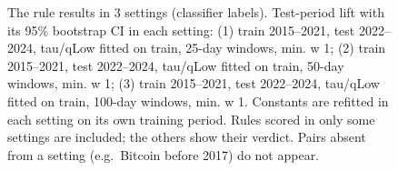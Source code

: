 \begin{figure}[t]
{\begin{tabular}{lllllllll}
\bottomrule
\end{tabular}
}
\caption{The rule results in 3 settings (classifier labels). Test-period lift with its 95\% bootstrap CI in each setting: (1) train 2015–2021, test 2022–2024, tau/qLow fitted on train, 25-day windows, min. w 1; (2) train 2015–2021, test 2022–2024, tau/qLow fitted on train, 50-day windows, min. w 1; (3) train 2015–2021, test 2022–2024, tau/qLow fitted on train, 100-day windows, min. w 1. Constants are refitted in each setting on its own training period. Rules scored in only some settings are included; the others show their verdict. Pairs absent from a setting (e.g.\ Bitcoin before 2017) do not appear.}
\label{fig:robustness_classifier}
\end{figure}
